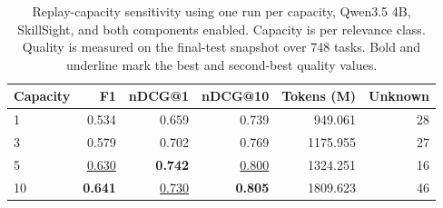 \begin{table}[t]
\centering
\small
\begin{tabular}{lrrrrr}
\toprule
Capacity & F1 & nDCG@1 & nDCG@10 & Tokens (M) & Unknown \\
\midrule
1 & 0.534 & 0.659 & 0.739 & 949.061 & 28 \\
3 & 0.579 & 0.702 & 0.769 & 1175.955 & 27 \\
5 & \underline{0.630} & \textbf{0.742} & \underline{0.800} & 1324.251 & 16 \\
10 & \textbf{0.641} & \underline{0.730} & \textbf{0.805} & 1809.623 & 46 \\
\bottomrule
\end{tabular}
\caption{Replay-capacity sensitivity using one run per capacity, Qwen3.5 4B, SkillSight, and both components enabled. Capacity is per relevance class. Quality is measured on the final-test snapshot over 748 tasks. Bold and underline mark the best and second-best quality values.}
\label{tab:app-replay-capacity}
\end{table}
